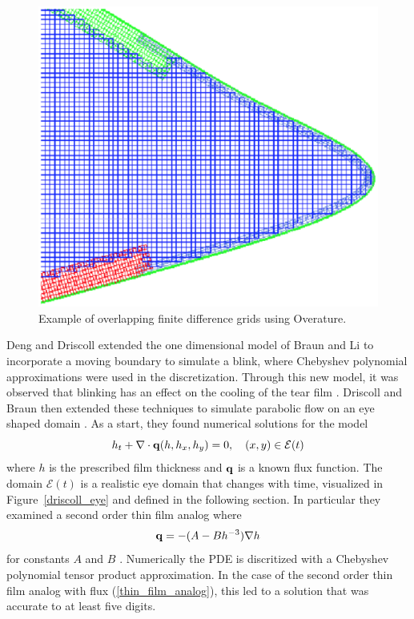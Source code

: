 \begin{figure}
	\centering
	\includegraphics[scale=0.6]{Chapter4/overature_eye}
	\caption{Example of overlapping finite difference grids using Overature. }
	\label{overature_eye}
\end{figure}

Deng and Driscoll extended the one dimensional model of Braun and Li \cite{li2012model} to incorporate a moving boundary to simulate a blink, where Chebyshev polynomial approximations were used in the discretization. Through this new model, it was observed that blinking has an effect on the cooling of the tear film \cite{deng2013model,deng2014heat}. Driscoll and Braun then extended these techniques to simulate parabolic flow on an eye shaped domain \cite{driscoll2018simulation}. As a start, they found numerical solutions for the model
\begin{equation}
\label{driscollPDE}
h_t + \nabla \cdot \mathbf{q} (h,h_x,h_y)=0, \quad (x,y) \in \mathcal{E}(t)
\end{equation}
where $h$ is the prescribed film thickness and $\mathbf{q}$ is a known flux function. The domain $\mathcal{E}(t)$ is a realistic eye domain that changes with time, visualized in Figure~\ref{driscoll_eye} and defined in the following section. In particular they examined a second order thin film analog where
\begin{equation}
\label{thin_film_analog}
\mathbf{q} = -(A-B h^{-3})\nabla h
\end{equation}
for constants $A$ and $B$ \cite{driscoll2018simulation}. Numerically the PDE is discritized with a Chebyshev polynomial tensor product approximation. In the case of the second order thin film analog with flux (\ref{thin_film_analog}), this led to a solution that was accurate to at least five digits.

